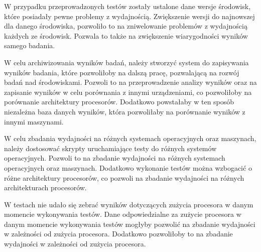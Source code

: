 W przypadku przeprowadzonych testów zostały ustalone dane wersje środowisk, które posiadały pewne problemy z wydajnością. Zwiększenie wersji do najnowszej dla danego środowiska, pozwoliło to na zniwelowanie problemów z wydajnością każdych ze środowisk. Pozwala to także na zwiększenie wiarygodności wyników samego badania.

W celu archiwizowania wyników badań, należy stworzyć system do zapisywania wyników badania, które pozwoliłoby na dalszą pracę, pozwalającą na rozwój badań nad środowiskami. Pozwoli to na przeprowadzenie analizy wyników oraz na zapisanie wyników w celu porównania z innymi urządzeniami, co pozwoliłoby na porównanie architektury procesorów. Dodatkowo powstałaby w ten sposób niezależna baza danych wyników, która pozwoliłaby na porównanie wyników z innymi maszynami.

W celu zbadania wydajności na różnych systemach operacyjnych oraz maszynach, należy dostosować skrypty uruchamiające testy do różnych systemów operacyjnych. Pozwoli to na zbadanie wydajności na różnych systemach operacyjnych oraz maszynach. Dodatkowo wykonanie testów można wzbogacić o różne architektury procesorów, co pozwoli na zbadanie wydajności na różnych architekturach procesorów.

W testach nie udało się zebrać wyników dotyczących zużycia procesora w danym momencie wykonywania testów. Dane odpowiedzialne za zużycie procesora w danym momencie wykonywania testów mogłyby pozwolić na zbadanie wydajności w zależności od zużycia procesora. Dodatkowo pozwoliłoby to na zbadanie wydajności w zależności od zużycia procesora.
